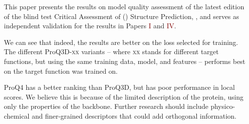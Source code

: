 \noindent
This paper presents the results on model quality assessment of the latest edition of the blind test Critical Assessment of () Structure Prediction, ,
and serves as independent validation for the results in Papers \textcolor{Maroon}{I} and \textcolor{Maroon}{IV}.

We can see that indeed, the results are better on the loss selected for training.
The different ProQ3D-\textsc{xx} variants -- where \textsc{xx} stands for different target functions, but using the same training data, model, and features  -- performs best on the target function was trained on.

ProQ4 has a better ranking than ProQ3D, but has poor performance in local scores.
We believe this is because of the limited description of the protein, using only the properties of the backbone.
Further research should include physico-chemical and finer-grained descriptors that could add orthogonal information.
